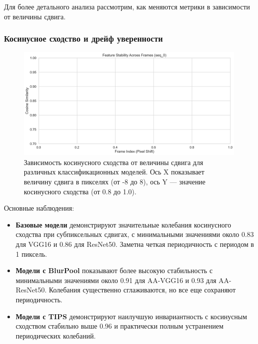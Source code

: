 Для более детального анализа рассмотрим, как меняются метрики в зависимости от величины сдвига.

\subsubsection{Косинусное сходство и дрейф уверенности}
\label{sec:experiments:classification:cosine}

\begin{figure}[ht]
\centering
\includegraphics[width=\textwidth]{images/classification/cosine_similarity_comparison_seq_0.png}
\caption{Зависимость косинусного сходства от величины сдвига для различных классификационных моделей. Ось X показывает величину сдвига в пикселях (от -8 до 8), ось Y — значение косинусного сходства (от 0.8 до 1.0).}
\label{fig:cosine_similarity}
\end{figure}

Основные наблюдения:

\begin{itemize}
    \item \textbf{Базовые модели} демонстрируют значительные колебания косинусного сходства при субпиксельных сдвигах, с минимальными значениями около 0.83 для VGG16 и 0.86 для ResNet50. Заметна четкая периодичность с периодом в 1 пиксель.
    
    \item \textbf{Модели с BlurPool} показывают более высокую стабильность с минимальными значениями около 0.91 для AA-VGG16 и 0.93 для AA-ResNet50. Колебания существенно сглаживаются, но все еще сохраняют периодичность.
    
    \item \textbf{Модели с TIPS} демонстрируют наилучшую инвариантность с косинусным сходством стабильно выше 0.96 и практически полным устранением периодических колебаний.
\end{itemize}

